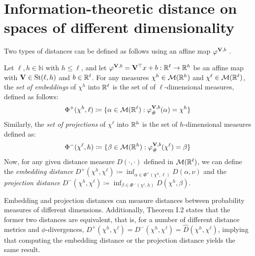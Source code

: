 
\section{Information-theoretic distance on spaces of different dimensionality} \label{app:infotheory}

Two types of distances can be defined as follows using an affine map $\varphi^{\mathbf{V},b}$ .

\begin{definition}
    Let $\ell, h \in \mathbb{N}$ with $h \leq \ell$, and let $\varphi^{\mathbf{V},b}  = \mathbf{V}^\top x+b :\mathbb{R}^\ell \to \mathbb{R}^h$ be an affine map with $\mathbf{V} \in  \mathrm{St}({\ell},{h})$ and $b\in \mathbb{R}^{\ell}$.
    For any measures $\chi^h \in \mathcal{M}(\mathbb{R}^h)$ and $\chi^{\ell} \in \mathcal{M}(\mathbb{R}^\ell)$, the \emph{set of embeddings} of $\chi^h$ into $\mathbb{R}^\ell$ is the set of of $\ell$-dimensional measures, defined as follows:
    \begin{align}
        \Phi^+(\chi^h, \ell) \coloneqq \{ \alpha\in \mathcal{M}(\reall^\ell): \varphi^{\V,b}_{\#}(\alpha) = \chi^h\}%
    \end{align}
    Similarly, the \emph{set of projections} of $\chi^{\ell}$ into $\mathbb{R}^h$ is the set of $h$-dimensional measures defined as:
    \begin{align}
        \Phi^-(\chi^{\ell}, h) \coloneqq \{ \beta\in \mathcal{M}(\reall^h): \varphi^{\V,b}_{\#}(\chi^{\ell}) = \beta \}%
    \end{align}
    Now, for any given distance measure $D(\cdot, \cdot)$ defined in $\mathcal{M}(\mathbb{R}^\ell)$, we can define the \emph{embedding distance} $D^+(\chi^h, \chi^{\ell}) \coloneqq \inf_{\alpha \in \Phi^+(\chi^h, \ell)}D(\alpha, \nu)$ and the \emph{projection distance} $D^-(\chi^h, \chi^{\ell}) \coloneqq \inf_{\beta \in \Phi^-(\chi^{\ell}, h)}D(\chi^h, \beta)$.
\end{definition}

Embedding and projection distances can measure distances between probability measures of different dimensions. 
Additionally, Theorem I.2  states that the former two distances are equivalent, that is, for a number of different distance metrics and $\phi$-divergences, $D^+(\chi^{h}, \chi^{\ell}) = D^-(\chi^{h}, \chi^{\ell}) = \hat{D}(\chi^{h}, \chi^{\ell})$, implying that computing the embedding distance or the projection distance yields the same result.
